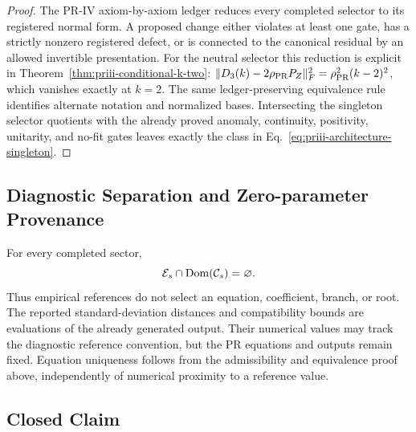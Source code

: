 \documentclass[11pt]{article}
\begin{document}
\begin{proof}
The PR-IV axiom-by-axiom ledger reduces every completed selector to its registered normal form.  A proposed change either violates at least one gate, has a strictly nonzero registered defect, or is connected to the canonical residual by an allowed invertible presentation.  For the neutral selector this reduction is explicit in
Theorem~\ref{thm:priii-conditional-k-two}:
\(\|D_3(k)-2\rho_{\rm PR}P_Z\|_F^2
=\rho_{\rm PR}^2(k-2)^2\), which vanishes exactly at \(k=2\).
The same ledger-preserving equivalence rule identifies alternate notation and normalized bases.  Intersecting the singleton selector quotients with the already proved anomaly, continuity, positivity, unitarity, and no-fit gates leaves exactly the class in Eq.~\eqref{eq:priii-architecture-singleton}.
\end{proof}

\subsection{Diagnostic Separation and Zero-parameter Provenance}
\label{subsec:priii-closed-diagnostic-separation}

For every completed sector,
\begin{equation}
\mathcal E_s\cap{\rm Dom}(\mathcal C_s)=\varnothing .
\end{equation}
Thus empirical references do not select an equation, coefficient, branch, or root.  The reported standard-deviation distances and compatibility bounds are evaluations of the already generated output.  Their numerical values may track the diagnostic reference convention, but the PR equations and outputs remain fixed.  Equation uniqueness follows from the admissibility and equivalence proof above, independently of numerical proximity to a reference value.

\subsection{Closed Claim}
\label{subsec:priii-closed-claim}
\end{document}
